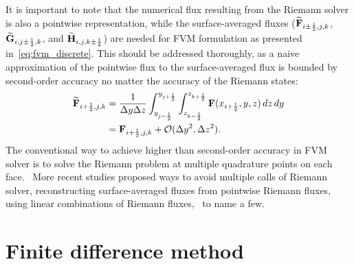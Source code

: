 It is important to note that the numerical flux resulting from the Riemann solver
is also a pointwise representation, while the surface-averaged fluxes
(\( \widetilde{\mathbf{F}}_{i \pm \frac{1}{2},j,k} \), \( \widetilde{\mathbf{G}}_{i,j \pm \frac{1}{2},k} \), and \( \widetilde{\mathbf{H}}_{i,j,k \pm \frac{1}{2}} \))
are needed for FVM formulation as presented in~\cref{eq:fvm_discrete}.
This should be addressed thoroughly, as a naive approximation of the pointwise flux to
the surface-averaged flux is bounded by second-order accuracy no matter the accuracy of the Riemann states:
\begin{equation}\label{eq:fvm_need_quad}
    \begin{split}
        \widetilde{\mathbf{F}}_{{i+\frac{1}{2}},j,k} &= \frac{1}{\Delta y\Delta z} \int^{y_{{j+\frac{1}{2}}}}_{y_{{j-\frac{1}{2}}}} \int^{z_{{k+\frac{1}{2}}}}_{z_{{k-\frac{1}{2}}}} \mathbf{F}(x_{{i+\frac{1}{2}}}, y, z) \mathop{dz} \mathop{dy} \\
                                   &= \mathbf{F}_{{i+\frac{1}{2}},j,k} + \mathcal{O}(\Delta y^{2}, \Delta z^{2}).
    \end{split}
\end{equation}
The conventional way to achieve higher than second-order accuracy in FVM solver
is to solve the Riemann problem at multiple quadrature points
on each face.~\cite{titarev2004finite,mccorquodale2011high,zhang2011order}
More recent studies proposed ways to avoid multiple calls of Riemann solver,
reconstructing surface-averaged fluxes from pointwise Riemann fluxes,~\cite{buchmuller2014improved,felker2018fourth}
using linear combinations of Riemann fluxes,~\cite{dumbser2007quadrature,dumbser2008unified}
to name a few.


\section{Finite difference method}\label{sec:fdm}

